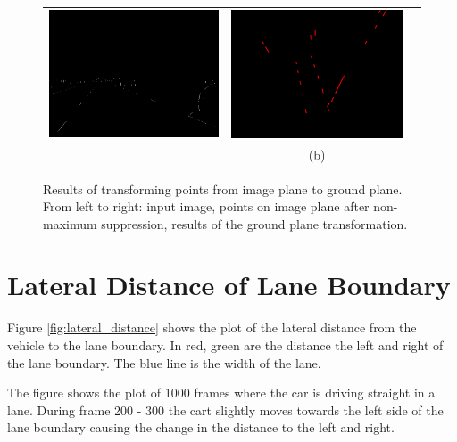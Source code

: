 \begin{figure}
\begin{tabular}{c c c}
      \includegraphics[width=55mm]{figures/image_to_ground_plane_transformation/localmaxima2.png} &
      \includegraphics[width=55mm]{figures/image_to_ground_plane_transformation/ground2.png} \\
      &(b)&\\
    
  \end{tabular}
    
  \caption{Results of transforming points from image plane to ground plane. From left to right: input image, points on image plane after non-maximum suppression, results of the ground plane transformation.}
  \label{fig:image_to_ground_plane}
\end{figure}


\section{Lateral Distance of Lane Boundary}

Figure \ref{fig:lateral_distance} shows the plot of the lateral distance from 
the vehicle to the lane boundary. In red, green are the distance the left and 
right of the lane boundary. The blue line is the width of the lane. 

The figure shows the plot of 1000 frames where the car is driving straight in a 
lane. During frame 200 - 300 the cart slightly moves towards the left side of 
the lane boundary causing the change in the distance to the left and right. 

